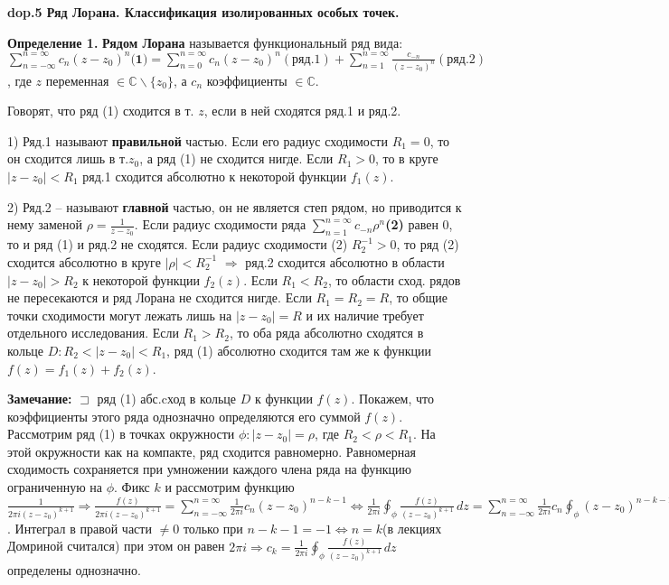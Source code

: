 \textbf{\LARGE dop.5 Ряд Лоpана. Классификация изолиpованных особых точек.}

\textbf{Определение 1.}
\textbf{Рядом Лорана} называется функциональный ряд вида: $\sum_{n=-\infty}^{n=\infty}c_n(z-z_0)^n\textbf{(1)} = \sum_{n=0}^{n=\infty}c_n(z-z_0)^n(\text{ряд.1}) +  \sum_{n=1}^{n=\infty}\frac{c_{-n}}{(z-z_0)^n}(\text{ряд.2})$, где $z$ переменная $\in \mathbb{C}\backslash\{z_0\}$, а $c_n$ коэффициенты $\in \mathbb{C}$.

\noindent Говорят, что ряд (1) сходится в т. $z$, если в ней сходятся ряд.1 и ряд.2.

    1) Ряд.1 называют \textbf{правильной} частью. Если его радиус сходимости $R_1=0$, то он сходится лишь в т.$z_0$, а ряд (1) не сходится нигде. Если $R_1>0$, то в круге $|z-z_0|<R_1$ ряд.1 сходится абсолютно к некоторой функции $f_1(z)$.
    
    2) Ряд.2 -- называют \textbf{главной} частью, он не является степ рядом, но приводится к нему заменой $\rho = \frac{1}{z-z_0}$. Если радиус сходимости ряда $\sum_{n=1}^{n=\infty}c_{-n}\rho^n$\textbf{(2)} равен 0, то и ряд (1) и ряд.2 не сходятся. Если радиус сходимости (2) $R^{-1}_2 > 0$, то ряд (2) сходится абсолютно в круге $|\rho|<R^{-1}_2$ $\Rightarrow$ ряд.2 сходится абсолютно в области $|z-z_0|>R_2$  к некоторой функции $f_2(z)$. Если $R_1<R_2$, то области сход. рядов не пересекаются и ряд Лорана не сходится нигде. Если $R_1=R_2=R$, то общие точки сходимости могут лежать лишь на $|z-z_0|=R$ и их наличие требует отдельного исследования. Если $R_1>R_2$, то оба ряда абсолютно сходятся в кольце $D: R_2<|z-z_0|<R_1$, ряд (1) абсолютно сходится там же к функции $f(z) = f_1(z)+f_2(z)$.
    
\textbf{Замечание:} $\sqsupset$ ряд (1) абс.cход в кольце $D$ к функции $f(z)$. Покажем, что коэффициенты этого ряда однозначно определяются его суммой $f(z)$. Рассмотрим ряд (1) в точках окружности $\phi: |z-z_0|=\rho$, где $R_2<\rho<R_1$. На этой окружности как на компакте, ряд сходится равномерно. Равномерная сходимость сохраняется при умножении каждого члена ряда на функцию ограниченную на $\phi$. Фикс $k$ и рассмотрим функцию $\frac{1}{2\pi i(z-z_0)^{k+1}} \Rightarrow \frac{f(z)}{2\pi i(z-z_0)^{k+1}} = \sum_{n=-\infty}^{n=\infty}\frac{1}{2\pi i}c_n(z-z_0)^{n-k-1} \Longleftrightarrow \frac{1}{2\pi i} \oint_\phi \frac{f(z)}{(z-z_0)^{k+1}} \,dz = \sum_{n=-\infty}^{n=\infty}\frac{1}{2\pi i}c_n\oint_\phi(z-z_0)^{n-k-1} \,dz$. Интеграл в правой части $\neq0$ только при $n-k-1=-1 \Longleftrightarrow n=k$(в лекциях Домриной считался) при этом он равен $2\pi i \Rightarrow c_k = \frac{1}{2\pi i} \oint_\phi \frac{f(z)}{(z-z_0)^{k+1}} \,dz$ определены однозначно.

